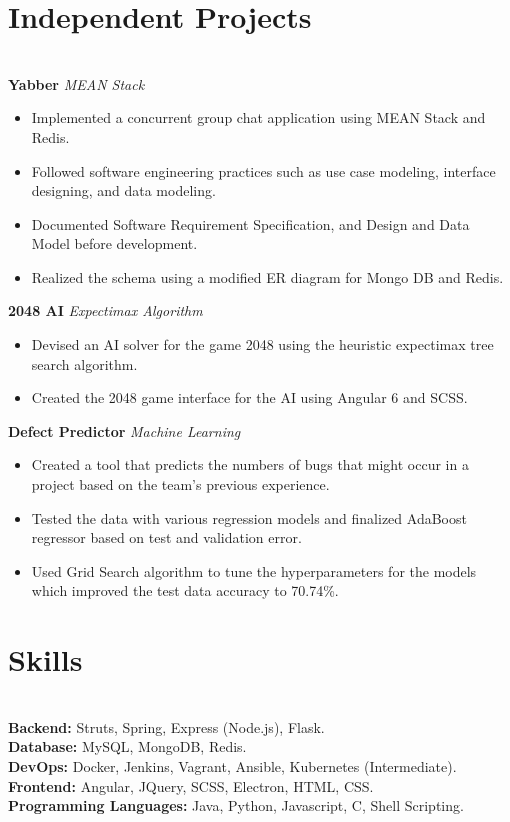 \documentclass{resume}
\begin{document}
\section*{Independent Projects}
\titlerule
\noindent
\\
\textbf{Yabber} \hfill \textit{MEAN Stack}
\begin{itemize}
  \item Implemented a concurrent group chat application using MEAN Stack and Redis.
  \item Followed software engineering practices such as use case modeling, interface designing, and data modeling.
  \item Documented Software Requirement Specification, and Design and Data Model before development.
  \item Realized the schema using a modified ER diagram for Mongo DB and Redis.
\end{itemize}
\textbf{2048 AI} \hfill \textit{Expectimax Algorithm}
\begin{itemize}
  \item Devised an AI solver for the game 2048 using the heuristic expectimax tree search algorithm.
  \item Created the 2048 game interface for the AI using Angular 6 and SCSS.
\end{itemize}
\textbf{Defect Predictor} \hfill \textit{Machine Learning}
\begin{itemize}
  \item Created a tool that predicts the numbers of bugs that might occur in a project based on the team's previous experience.
  \item Tested the data with various regression models and finalized AdaBoost regressor based on test and validation error.
  \item Used Grid Search algorithm to tune the hyperparameters for the models which improved the test data accuracy to 70.74\%.
\end{itemize}
\section*{Skills}
\titlerule
\noindent
\\
\textbf{Backend:} Struts, Spring, Express (Node.js), Flask. \\
\textbf{Database:} MySQL, MongoDB, Redis. \\
\textbf{DevOps:} Docker, Jenkins, Vagrant, Ansible, Kubernetes (Intermediate). \\
\textbf{Frontend:} Angular, JQuery, SCSS, Electron, HTML, CSS. \\
\textbf{Programming Languages:} Java, Python, Javascript, C, Shell Scripting.\\
\end{document}
